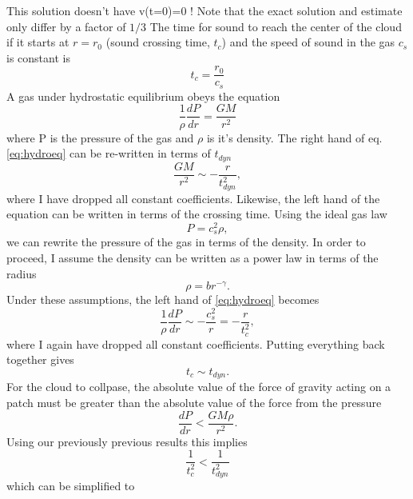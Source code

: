 \documentclass[11pt]{article}
\begin{document}
This solution doesn't have v(t=0)=0 !
Note that the exact solution and estimate only differ by a factor of \(1/3\)
The time for sound to reach the center of the cloud if it starts at \(r = r_{0}\) (sound crossing time, \(t_{c}\)) and the speed of sound in the gas \(c_s\) is constant is
\begin{equation}
 t_{c} = \frac{r_{0}}{c_{s}}
\end{equation}
A gas under hydrostatic equilibrium obeys the equation
\begin{equation}\label{eq:hydroeq}
 \frac{1}{\rho} \frac{d P}{d r} = \frac{G M}{r^{2}}
\end{equation}
where P is the pressure of the gas and \(\rho\) is it's density.
The right hand of eq. \ref{eq:hydroeq} can be re-written in terms of \(t_{dyn}\)
\begin{equation}\label{eq:left}
 \frac{G M}{r^{2}} \sim -\frac{r}{t_{dyn}^{2}},
\end{equation}
where I have dropped all constant coefficients.
Likewise, the left hand of the equation can be written in terms of the crossing time.
Using the ideal gas law
\begin{equation}
 P = c_{s}^{2} \rho,
\end{equation}
we can rewrite the pressure of the gas in terms of the density.
In order to proceed, I assume the density can be written as a power law in terms of the radius
\begin{equation}
 \rho = b r^{-\gamma}.
\end{equation}
Under these assumptions, the left hand of \ref{eq:hydroeq} becomes
\begin{equation}\label{eq:left}
 \frac{1}{\rho} \frac{d P}{dr} \sim -\frac{c_{s}^{2}}{r} = -\frac{r}{t_{c}^{2}},
\end{equation}
where I again have dropped all constant coefficients.
Putting everything back together gives
\begin{equation}
 t_{c} \sim t_{dyn}.
\end{equation}
For the cloud to collpase, the absolute value of the force of gravity acting on a patch must be greater than the absolute value of the force from the pressure
\begin{equation}
 \frac{dP}{dr} < \frac{G M \rho}{r^{2}}.
\end{equation}
Using our previously previous results this implies
\begin{equation}
  \frac{1}{t_{c}^{2}} < \frac{1}{t_{dyn}^{2}}
\end{equation}
which can be simplified to
\end{document}
